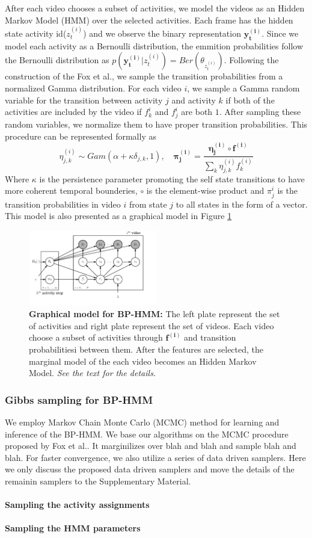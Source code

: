 After each video chooses a subset of activities, we model the videos as an Hidden Markov Model (HMM) over the selected activities. Each frame has the hidden state activity id($z^{(i)}_t$) and we observe the binary representation $\mathbf{y^{(i)}_t}$. Since we model each activity as a Bernoulli distribution, the emmition probabilities follow the Bernoulli distribution as $p(\mathbf{y^{(i)}_t}|z^{(i)}_t)=Ber(\theta_{z^{(i)}_t})$. Following the construction of the Fox et al.\cite{foxBPHMM}, we sample the transition probabilities from a normalized Gamma distribution. For each video $i$, we sample a Gamma random variable for the transition between activity $j$ and activity $k$ if both of the activities are included by the video \ie if $f^i_k$ and $f^i_j$ are both $1$. After sampling these random variables, we normalize them to have proper transition probabilities. This procedure can be represented formally as
\begin{equation}
  \eta_{j,k}^{(i)} \sim Gam(\alpha+\kappa \delta_{j,k},1), \quad \mathbf{\pi_j^{(i)}} = \frac{\mathbf{\eta^{(i)}_j} \circ \mathbf{f^{(i)}}}{\sum_k \eta^{(i)}_{j,k} f^{(i)}_k}
\end{equation}
Where $\kappa$ is the persistence parameter promoting the self state transitions to have more coherent temporal bounderies, $\circ$ is the element-wise product and $\pi^i_j$ is the transition probabilities in video $i$ from state $j$ to all states in the form of a vector. This model is also presented as a graphical model in Figure \ref{bphmmo}
\begin{figure}[h!]
  \includegraphics[width=0.5\textwidth]{plate}
  \caption{\textbf{Graphical model for BP-HMM:} The left plate represent the set of activities and right plate represent the set of videos. Each video choose a subset of activities through $\mathbf{f^{(i)}}$ and transition probabilitiesi between them. After the features are selected, the marginal model of the each video becomes an Hidden Markov Model. \emph{See the text for the details.}}
  \label{bphmmo}
\end{figure}


\subsubsection{Gibbs sampling for BP-HMM}
We employ Markov Chain Monte Carlo (MCMC) method for learning and inference of the BP-HMM. We base our algorithms on the MCMC procedure proposed by Fox et al.\cite{foxBPHMM}. It marginilizes over blah and blah and sample blah and blah. For faster convergence, we also utilize a series of data driven samplers. Here we only discuss the proposed data driven samplers and move the details of the remainin samplers to the Supplementary Material.

\paragraph{Sampling the activity assignments}
\paragraph{Sampling the HMM parameters}
